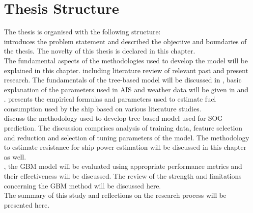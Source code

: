 \pagebreak

\section{Thesis Structure}\label{sec:structure_thesis}

The thesis is organised with the following structure:\\

\textbf{} introduces the problem statement and described the objective and boundaries of the thesis. The novelty of this thesis is declared in this chapter.\\

\textbf{} The fundamental aspects of the methodologies used to develop the model will be explained in this chapter. including literature review of relevant past and present research. The fundamentals of the tree-based model will be discussed in , basic explanation of the parameters used in AIS and weather data will be given in  and .  presents the empirical formulas and parameters used to estimate fuel consumption used by the ship based on various literature studies.\\ 

\textbf{} discuss the methodology used to develop tree-based model used for SOG prediction. The discussion comprises analysis of training data, feature selection and reduction and selection of tuning parameters of the model. The methodology to estimate resistance for ship power estimation will be discussed in this chapter as well.\\ 

\textbf{}, the GBM model will be evaluated using appropriate performance metrics and their effectiveness will be discussed. The review of the strength and limitations concerning the GBM method will be discussed here.\\

\textbf{} The summary of this study and reflections on the research process will be presented here. 




 






